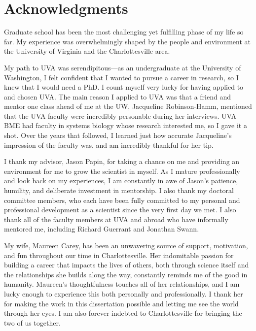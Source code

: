 \documentclass[11pt,twocolumn,notitlepage,openany,twoside]{book}
\begin{document}
\setcounter{tocdepth}{3}
\tableofcontents
\hspace{1.5cm}
\listoffigures
\hspace{1.5cm}


\endgroup
\clearpage
{}
\section{Acknowledgments}
\thispagestyle{plain}
Graduate school has been the most challenging yet fulfilling phase of my life so far. My experience was overwhelmingly shaped by the people and environment at the University of Virginia and the Charlottesville area.

My path to UVA was serendipitous---as an undergraduate at the University of Washington, I felt confident that I wanted to pursue a career in research, so I knew that I would need a PhD. I count myself very lucky for having applied to and chosen UVA. The main reason I applied to UVA was that a friend and mentor one class ahead of me at the UW, Jacqueline Robinson-Hamm, mentioned that the UVA faculty were incredibly personable during her interviews. UVA BME had faculty in systems biology whose research interested me, so I gave it a shot. Over the years that followed, I learned just how accurate Jacqueline's impression of the faculty was, and am incredibly thankful for her tip.

I thank my advisor, Jason Papin, for taking a chance on me and providing an environment for me to grow the scientist in myself. As I mature professionally and look back on my experiences, I am constantly in awe of Jason's patience, humility, and deliberate investment in mentorship. I also thank my doctoral committee members, who each have been fully committed to my personal and professional development as a scientist since the very first day we met. I also thank all of the faculty members at UVA and abroad who have informally mentored me, including Richard Guerrant and Jonathan Swann.

My wife, Maureen Carey, has been an unwavering source of support, motivation, and fun throughout our time in Charlottesville. Her indomitable passion for building a career that impacts the lives of others, both through science itself and the relationships she builds along the way, constantly reminds me of the good in humanity. Maureen's thoughtfulness touches all of her relationships, and I am lucky enough to experience this both personally and professionally. I thank her for making the work in this dissertation possible and letting me see the world through her eyes. I am also forever indebted to Charlottesville for bringing the two of us together.
\end{document}
